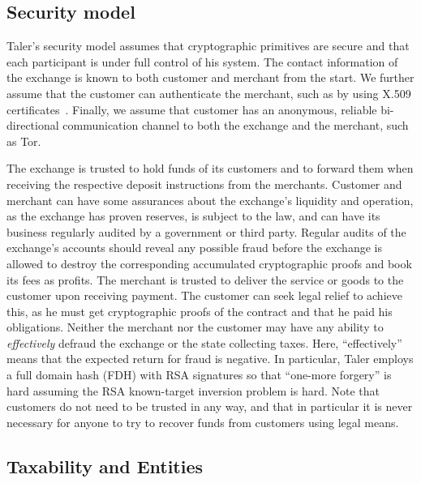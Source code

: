 \documentclass{llncs}
\begin{document}
\subsection{Security model}

Taler's security model assumes that cryptographic primitives are
secure and that each participant is under full control of his system.
The contact information of the exchange is known to both customer and
merchant from the start.  
We further assume that the customer can authenticate the merchant,
such as by using X.509 certificates~\cite{rfc5280}. %
Finally, we assume that customer has an anonymous, reliable bi-directional
communication channel to both the exchange and the merchant, such as Tor.

The exchange is trusted to hold funds of its customers and to forward them
when receiving the respective deposit instructions from the merchants.
Customer and merchant can have some assurances about the exchange's
liquidity and operation, as the exchange has proven reserves, is subject
to the law, and can have its business regularly audited
 by a government or third party.
Regular audits of the exchange's accounts should reveal any possible fraud
before the exchange is allowed to destroy the corresponding accumulated
cryptographic proofs and book its fees as profits.
%
The merchant is trusted to deliver the service or goods to the
customer upon receiving payment.  The customer can seek legal relief
to achieve this, as he must get cryptographic proofs of the contract
and that he paid his obligations.
%
Neither the merchant nor the customer may have any ability to {\em
  effectively} defraud the exchange or the state collecting taxes.  Here,
``effectively'' means that the expected return for fraud is negative.
In particular, Taler employs a full domain hash (FDH) with RSA signatures
so that ``one-more forgery'' is hard assuming the RSA known-target
inversion problem is hard.\cite[Theorem12]{RSA-HDF-KTIvCTI}
Note that customers do not need to be trusted in any way, and that in
particular it is never necessary for anyone to try to recover funds
from customers using legal means.





\subsection{Taxability and Entities}
\end{document}
